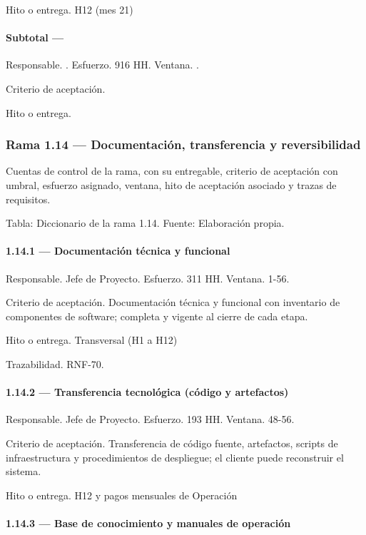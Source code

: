 \documentclass[11pt]{article}
\begin{document}
Hito o entrega. H12 (mes 21)

\paragraph{Subtotal — }

Responsable. . Esfuerzo. 916 HH. Ventana. .

Criterio de aceptación.

Hito o entrega.

\subsubsection{Rama 1.14 — Documentación, transferencia y reversibilidad}

Cuentas de control de la rama, con su entregable, criterio de aceptación con umbral, esfuerzo asignado, ventana, hito de aceptación asociado y trazas de requisitos.

Tabla: Diccionario de la rama 1.14. Fuente: Elaboración propia.

\paragraph{1.14.1 — Documentación técnica y funcional}

Responsable. Jefe de Proyecto. Esfuerzo. 311 HH. Ventana. 1-56.

Criterio de aceptación. Documentación técnica y funcional con inventario de componentes de software; completa y vigente al cierre de cada etapa.

Hito o entrega. Transversal (H1 a H12)

Trazabilidad. RNF-70.

\paragraph{1.14.2 — Transferencia tecnológica (código y artefactos)}

Responsable. Jefe de Proyecto. Esfuerzo. 193 HH. Ventana. 48-56.

Criterio de aceptación. Transferencia de código fuente, artefactos, scripts de infraestructura y procedimientos de despliegue; el cliente puede reconstruir el sistema.

Hito o entrega. H12 y pagos mensuales de Operación

\paragraph{1.14.3 — Base de conocimiento y manuales de operación}
\end{document}
